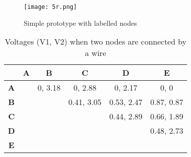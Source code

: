 \begin{figure}[H]
	\begin{center}
	\texttt{[image: 5r.png]}\\ 
  	\caption{Simple prototype with labelled nodes}
    \label{fig:5r}
    \end{center}
\end{figure}



\begin{table}[H]
\centering
\begin{tabular}{c|ccccc}
\cline{2-6}
                                 & \multicolumn{1}{c|}{\textbf{A}}                 & \multicolumn{1}{c|}{\textbf{B}}                 & \multicolumn{1}{c|}{\textbf{C}}                 & \multicolumn{1}{c|}{\textbf{D}}                 & \multicolumn{1}{c|}{\textbf{E}}                 \\ \hline
\multicolumn{1}{|c|}{\textbf{A}} & \multicolumn{1}{c|}{\cellcolor[HTML]{C0C0C0}}   & \multicolumn{1}{c|}{0, 3.18}                    & \multicolumn{1}{c|}{0, 2.88}                    & \multicolumn{1}{c|}{0, 2.17}                    & \multicolumn{1}{c|}{0, 0}                       \\ \cline{1-1} \cline{3-6} 
\multicolumn{1}{|c|}{\textbf{B}} & \cellcolor[HTML]{C0C0C0}                        & \multicolumn{1}{c|}{\cellcolor[HTML]{C0C0C0}}   & \multicolumn{1}{c|}{0.41, 3.05}                 & \multicolumn{1}{c|}{0.53, 2.47}                 & \multicolumn{1}{c|}{0.87, 0.87}                 \\ \cline{1-1} \cline{4-6} 
\multicolumn{1}{|c|}{\textbf{C}} & \cellcolor[HTML]{C0C0C0}                        & \cellcolor[HTML]{C0C0C0}                        & \multicolumn{1}{c|}{\cellcolor[HTML]{C0C0C0}}   & \multicolumn{1}{c|}{0.44, 2.89}                 & \multicolumn{1}{c|}{0.66, 1.89}                 \\ \cline{1-1} \cline{5-6} 
\multicolumn{1}{|c|}{\textbf{D}} & \cellcolor[HTML]{C0C0C0}                        & \cellcolor[HTML]{C0C0C0}                        & \cellcolor[HTML]{C0C0C0}                        & \multicolumn{1}{c|}{\cellcolor[HTML]{C0C0C0}}   & \multicolumn{1}{c|}{0.48, 2.73}                 \\ \cline{1-1} \cline{6-6} 
\multicolumn{1}{|c|}{\textbf{E}} & \cellcolor[HTML]{C0C0C0}{\color[HTML]{333333} } & \cellcolor[HTML]{C0C0C0}{\color[HTML]{333333} } & \cellcolor[HTML]{C0C0C0}{\color[HTML]{333333} } & \cellcolor[HTML]{C0C0C0}{\color[HTML]{333333} } & \cellcolor[HTML]{C0C0C0}{\color[HTML]{333333} } \\ \cline{1-1}
\end{tabular}
\caption{Voltages (V1, V2) when two nodes are connected by a wire}
\label{tab:5r_voltages}
\end{table}

